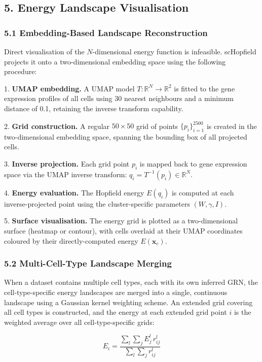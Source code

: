 \documentclass[11pt]{article}
\begin{document}
\subsection*{5. Energy Landscape Visualisation}


\subsubsection*{5.1 Embedding-Based Landscape Reconstruction}

Direct visualisation of the $N$-dimensional energy function is infeasible. scHopfield projects it onto a two-dimensional embedding space using the following procedure:

1. \textbf{UMAP embedding.} A UMAP model $T: \mathbb{R}^N \to \mathbb{R}^2$ is fitted to the gene expression profiles of all cells using 30 nearest neighbours and a minimum distance of 0.1, retaining the inverse transform capability.

2. \textbf{Grid construction.} A regular $50 \times 50$ grid of points $\{p_i\}_{i=1}^{2500}$ is created in the two-dimensional embedding space, spanning the bounding box of all projected cells.

3. \textbf{Inverse projection.} Each grid point $p_i$ is mapped back to gene expression space via the UMAP inverse transform: $q_i = T^{-1}(p_i) \in \mathbb{R}^N$.

4. \textbf{Energy evaluation.} The Hopfield energy $E(q_i)$ is computed at each inverse-projected point using the cluster-specific parameters $(W, \gamma, I)$.

5. \textbf{Surface visualisation.} The energy grid is plotted as a two-dimensional surface (heatmap or contour), with cells overlaid at their UMAP coordinates coloured by their directly-computed energy $E(\mathbf{x}_c)$.


\subsubsection*{5.2 Multi-Cell-Type Landscape Merging}

When a dataset contains multiple cell types, each with its own inferred GRN, the cell-type-specific energy landscapes are merged into a single, continuous landscape using a Gaussian kernel weighting scheme. An extended grid covering all cell types is constructed, and the energy at each extended grid point $i$ is the weighted average over all cell-type-specific grids:


\begin{equation}
E_i = \frac{\displaystyle\sum_l \sum_j E_j^l\,r_{ij}^l}{\displaystyle\sum_l \sum_j r_{ij}^l} 
\end{equation}
\end{document}
